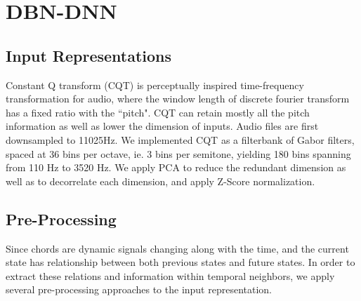 \documentclass{article}
\begin{document}


\section{DBN-DNN}
\subsection{Input Representations}
Constant Q transform (CQT) is perceptually inspired time-frequency transformation for audio, where the window length of discrete fourier transform has a fixed ratio with the ``pitch". CQT can retain mostly all the pitch information as well as lower the dimension of inputs. Audio files are first downsampled to 11025Hz. We implemented CQT as a filterbank of Gabor filters, spaced at 36 bins per octave, ie. 3 bins per semitone, yielding 180 bins spanning from 110 Hz to 3520 Hz. We apply PCA to reduce the redundant dimension as well as to decorrelate each dimension, and apply Z-Score normalization\cite{sola1997importance}. 

\subsection{Pre-Processing}\label{sec:pre-proc}
Since chords are dynamic signals changing along with the time, and the current state has relationship between both previous states and future states. In order to extract these relations and information within temporal neighbors, we apply several pre-processing approaches to the input representation. 
\end{document}

